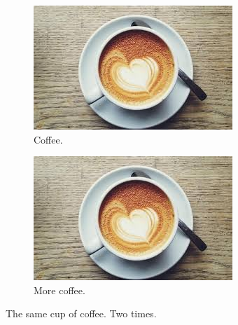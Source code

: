 \documentclass{article}
\begin{document}
\begin{figure}[h!]
    \centering
    \begin{subfigure}[b]{0.4\linewidth}
        \includegraphics[width=\linewidth]{coffee.jpg}
        \caption{Coffee.}
    \end{subfigure}
    \begin{subfigure}[b]{0.4\linewidth}
        \includegraphics[width=\linewidth]{coffee.jpg}
        \caption{More coffee.}
    \end{subfigure}
    \caption{The same cup of coffee. Two times.}
    \label{fig:coffee}
\end{figure}
\end{document}
